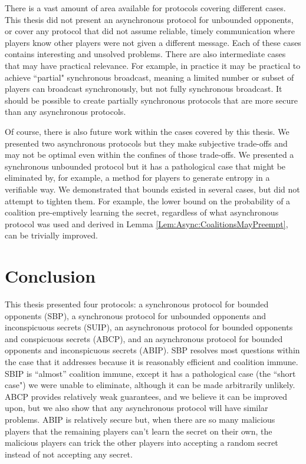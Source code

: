 \documentclass{dalcsthesis}
\begin{document}
There is a vast amount of area available for protocols covering different cases. This thesis did not present an asynchronous protocol for unbounded opponents, or cover any protocol that did not assume reliable, timely communication where players know other players were not given a different message. Each of these cases contains interesting and unsolved problems. There are also intermediate cases that may have practical relevance. For example, in practice it may be practical to achieve ``partial" synchronous broadcast, meaning a limited number or subset of players can broadcast synchronously, but not fully synchronous broadcast. It should be possible to create partially synchronous protocols that are more secure than any asynchronous protocols.

Of course, there is also future work within the cases covered by this thesis. We presented two asynchronous protocols but they make subjective trade-offs and may not be optimal even within the confines of those trade-offs. We presented a synchronous unbounded protocol but it has a pathological case that might be eliminated by, for example, a method for players to generate entropy in a verifiable way. We demonstrated that bounds existed in several cases, but did not attempt to tighten them. For example, the lower bound on the probability of a coalition pre-emptively learning the secret, regardless of what asynchronous protocol was used and derived in Lemma \ref{Lem:Async:CoalitionsMayPreempt}, can be trivially improved.




\chapter{Conclusion}
\label{chapter:Conclusion}

This thesis presented four protocols: a synchronous protocol for bounded opponents (SBP), a synchronous protocol for unbounded opponents and inconspicuous secrets (SUIP), an asynchronous protocol for bounded opponents and conspicuous secrets (ABCP), and an asynchronous protocol for bounded opponents and inconspicuous secrets (ABIP). SBP resolves most questions within the case that it addresses because it is reasonably efficient and coalition immune. SBIP is ``almost'' coalition immune, except it has a pathological case (the ``short case") we were unable to eliminate, although it can be made arbitrarily unlikely. ABCP provides relatively weak guarantees, and we believe it can be improved upon, but we also show that any asynchronous protocol will have similar problems. ABIP is relatively secure but, when there are so many malicious players that the remaining players can't learn the secret on their own, the malicious players can trick the other players into accepting a random secret instead of not accepting any secret.
\end{document}
